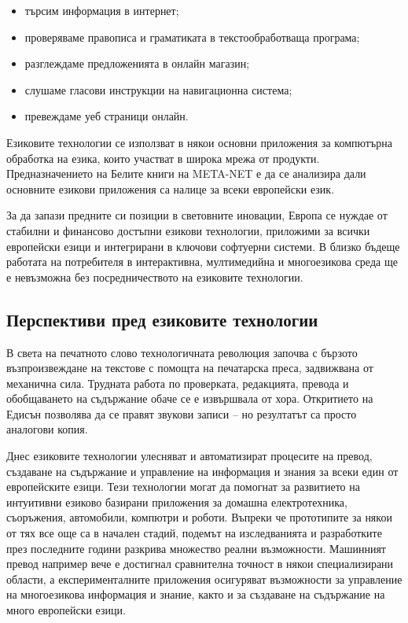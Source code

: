 \documentclass[]{../../metanetpaper}
\begin{document}
\begin{multicols}{2}
\begin{itemize}
\item търсим информация в интернет;
\item проверяваме правописа и граматиката в текстообработваща програма;
\item разглеждаме предложенията в онлайн магазин;
\item слушаме гласови инструкции на навигационна система;
\item превеждаме уеб страници онлайн.
\end{itemize}

Езиковите технологии се използват в някои основни приложения за компютърна обработка на езика, които участват в широка мрежа от продукти. Предназначението на Белите книги на META-NET е да се анализира дали основните езикови приложения са налице за всеки европейски език.


За да запази предните си позиции в световните иновации, Европа се нуждае от стабилни и финансово достъпни езикови технологии, приложими за всички европейски езици и интегрирани в ключови софтуерни системи.
В близко бъдеще работата на потребителя в интерактивна, мултимедийна и многоезикова  среда ще е  невъзможна
без посредничеството на езиковите технологии.

\subsection{Перспективи пред езиковите технологии}

В света на печатното слово технологичната революция започва с бързото възпроизвеждане на текстове с помощта на печатарска преса, задвижвана от механична сила. Трудната работа по проверката, редакцията, превода и обобщаването на съдържание обаче се е извършвала от хора. Откритието на Едисън позволява да се правят звукови записи – но резултатът са просто аналогови копия.

Днес езиковите технологии улесняват и автоматизират процесите на превод, създаване на съдържание и управление на информация и знания за всеки един от европейските езици. Тези технологии могат да помогнат за развитието на интуитивни
 езиково базирани приложения за домашна електротехника, съоръжения, автомобили, компютри и роботи. Въпреки че прототипите
 за някои от тях все още са в начален стадий, подемът на изследванията и разработките през последните години разкрива множество реални възможности. Машинният превод например вече е достигнал сравнителна точност в някои специализирани области, а
 експерименталните приложения осигуряват възможности за управление на
 многоезикова информация и знание, както и за
 създаване на съдържание на много европейски езици.


\end{multicols}
\end{document}
